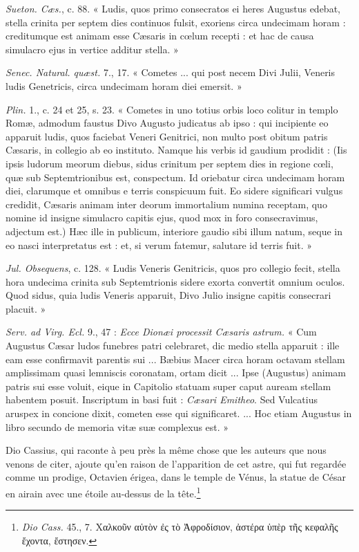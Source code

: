 \documentclass[a4paper, 11pt, oneside, polutonikogreek, french]{article}
\begin{document}
\emph{Sueton. Cæs.}, c. 88. « Ludis, quos primo consecratos ei heres Augustus edebat, stella crinita per septem dies continuos fulsit, exoriens circa undecimam horam : creditumque est animam esse Cæsaris in cœlum recepti : et hac de causa simulacro ejus in vertice additur stella. »

\emph{Senec. Natural. quæst.} 7., 17. « Cometes ... qui post necem Divi Julii, Veneris ludis Genetricis, circa undecimam horam diei emersit. »

\emph{Plin.} 1., c. 24 et 25, s. 23. « Cometes in uno totius orbis loco colitur in templo Romæ, admodum faustus Divo Augusto judicatus ab ipso : qui incipiente eo apparuit ludis, quos faciebat Veneri Genitrici, non multo post obitum patris Cæsaris, in collegio ab eo instituto. Namque his verbis id gaudium prodidit : (Iis ipsis ludorum meorum diebus, sidus crinitum per septem dies in regione cœli, quæ sub Septemtrionibus est, conspectum. Id oriebatur circa undecimam horam diei, clarumque et omnibus e terris conspicuum fuit. Eo sidere significari vulgus credidit, Cæsaris animam inter deorum immortalium numina receptam, quo nomine id insigne simulacro capitis ejus, quod mox in foro consecravimus, adjectum est.) Hæc ille in publicum, interiore gaudio sibi illum natum, seque in eo nasci interpretatus est : et, si verum fatemur, salutare id terris fuit. »

\emph{Jul. Obsequens}, c. 128. « Ludis Veneris Genitricis, quos pro collegio fecit, stella hora undecima crinita sub Septemtrionis sidere exorta convertit omnium oculos. Quod sidus, quia ludis Veneris apparuit, Divo Julio insigne capitis consecrari placuit. »

\emph{Serv. ad Virg. Ecl.} 9., 47 : \emph{Ecce Dionæi processit Cæsaris astrum.} « Cum Augustus Cæsar ludos funebres patri celebraret, dic medio stella apparuit : ille eam esse confirmavit parentis sui ... Bæbius Macer circa horam octavam stellam amplissimam quasi lemniscis coronatam, ortam dicit ... Ipse (Augustus) animam patris sui esse voluit, eique in Capitolio statuam super caput auream stellam habentem posuit. Inscriptum in basi fuit : \emph{Cæsari Emitheo}. Sed Vulcatius aruspex in concione dixit, cometen esse qui significaret. ... Hoc etiam Augustus in libro secundo de memoria vitæ suæ complexus est. »

Dio Cassius, qui raconte à peu près la même chose que les auteurs que nous venons de citer, ajoute qu'en raison de l'apparition de cet astre, qui fut regardée comme un prodige, Octavien érigea, dans le temple de Vénus, la statue de César en airain avec une étoile au-dessus de la tête.\footnote{\emph{Dio Cass.} 45., 7. Χαλκοῦν αὐτὸν ἐς τὸ Ἀφροδίσιον, ἀστέρα ὑπὲρ τῆς κεφαλῆς ἔχοντα, ἔστησεν.}
\end{document}
